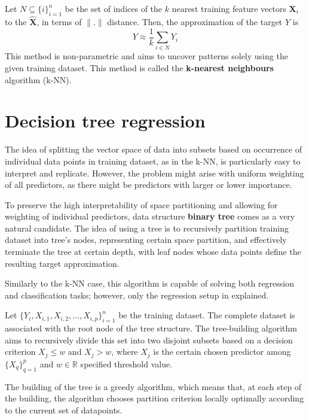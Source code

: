 Let $N \subseteq \{i\}_{i=1}^{n}$ be the set of indices of the $k$ nearest training feature vectors $\bm{X}_i$ to the $\bm{\hat{X}}$, in terms of $\|.\|$ distance. Then, the approximation of the target $Y$ is 
\begin{equation}
    Y \approx \frac{1}{k}\sum_{i \in N} Y_i    
\end{equation}
This method is non-parametric and aims to uncover patterns solely using the given training dataset. This method is called the \textbf{k-nearest neighbours} algorithm (k-NN). 

\section{Decision tree regression}

The idea of splitting the vector space of data into subsets based on occurrence of individual data points 
in training dataset, as in the k-NN, is particularly easy to interpret and replicate. However, 
the problem might arise with uniform weighting of all predictors, as there might 
be predictors with larger or lower importance.

To preserve the high interpretability of space partitioning and allowing for weighting of individual predictors, 
data structure \textbf{binary tree} comes as a very natural candidate. The idea of using a tree
is to recursively partition training dataset into tree's nodes, representing certain space partition, and effectively terminate the tree at certain 
depth, with leaf nodes whose data points define the resulting target approximation.

Similarly to the k-NN case, this algorithm is capable of solving both regression and classification tasks; however,
only the regression setup in explained.

Let $\{ Y_i, X_{i, 1}, X_{i, 2}, \ldots, X_{i, p} \}_{i=1}^{n}$
be the training dataset. The complete dataset is associated with the root node of the tree structure. The tree-building algorithm aims to recursively divide this set
into two disjoint subsets based on a decision criterion $X_j \leq w$ and $X_j > w$, where $X_j$ is the certain chosen predictor among $\{X_q\}_{q=1}^{p}$
and $w \in \mathbb{R}$ specified threshold value.

The building of the tree is a greedy algorithm, which means that, at each step of the building, the algorithm chooses
partition criterion locally optimally according to the current set of datapoints.

